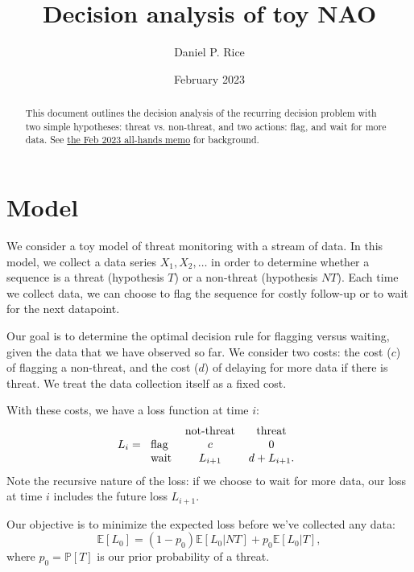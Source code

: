 \documentclass[12pt, letterpaper]{article}
\title{Decision analysis of toy NAO}
\author{Daniel P. Rice}
\date{February 2023}
\begin{document}
\maketitle

\begin{abstract}
    This document outlines the decision analysis of the recurring decision problem with two simple hypotheses: threat vs. non-threat, and two actions: flag, and wait for more data.
    See \href{https://docs.google.com/document/d/1CsTdi18Nt4UGAkmTSUeFLiZsvC4N4-b_AdL7-Gddu_M/edit?usp=sharing}{the Feb 2023 all-hands memo} for background.
\end{abstract}

\tableofcontents

\section{Model}

We consider a toy model of threat monitoring with a stream of data.
In this model, we collect a data series ${X_1, X_2, \ldots}$ in order to determine whether a sequence is a threat (hypothesis $T$) or a non-threat (hypothesis $NT$).
Each time we collect data, we can choose to flag the sequence for costly follow-up or to wait for the next datapoint.

Our goal is to determine the optimal decision rule for flagging versus waiting, given the data that we have observed so far.
We consider two costs: the cost ($c$) of flagging a non-threat, and the cost ($d$) of delaying for more data if there is threat.
We treat the data collection itself as a fixed cost.

With these costs, we have a loss function at time $i$:
\begin{equation}
    L_i =
    \begin{tabular}{l c c}
        & not-threat & threat \\
        flag & $c$ & $0$ \\
        wait & $L_{i+1}$ & $d + L_{i+1}$.
    \end{tabular}
    \label{eq:loss}
\end{equation}
Note the recursive nature of the loss: if we choose to wait for more data, our loss at time $i$ includes the future loss $L_{i+1}$.

Our objective is to minimize the expected loss before we've collected any data:
\begin{equation}
    \mathbb{E}[L_0] = (1-p_0)\mathbb{E}[L_0 | NT] + p_0\mathbb{E}[L_0 | T],
    \label{eq:loss_cond}
\end{equation}
where $p_0 = \mathbb{P}[T]$ is our prior probability of a threat.
\end{document}
